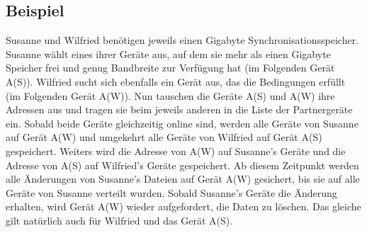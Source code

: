 \subsection{Beispiel}
Susanne und Wilfried benötigen jeweils einen Gigabyte Synchronisationsspeicher. Susanne wählt eines ihrer Geräte aus, auf dem sie mehr als einen Gigabyte Speicher frei und genug Bandbreite zur Verfügung hat (im Folgenden Gerät A(S)). Wilfried sucht sich ebenfalls ein Gerät aus, das die Bedingungen erfüllt (im Folgenden Gerät A(W)). Nun tauschen die Geräte A(S) und A(W) ihre Adressen aus und tragen sie beim jeweils anderen in die Liste der Partnergeräte ein. Sobald beide Geräte gleichzeitig online sind, werden alle Geräte von Susanne auf Gerät A(W) und umgekehrt alle Geräte von Wilfried auf Gerät A(S) gespeichert. Weiters wird die Adresse von A(W) auf Susanne's Geräte und die Adresse von A(S) auf Wilfried's Geräte gespeichert. Ab diesem Zeitpunkt werden alle Änderungen von Susanne's Dateien auf Gerät A(W) gesichert, bis sie auf alle Geräte von Susanne verteilt wurden. Sobald Susanne's Geräte die Änderung erhalten, wird Gerät A(W) wieder aufgefordert, die Daten zu löschen. Das gleiche gilt natürlich auch für Wilfried und das Gerät A(S). 